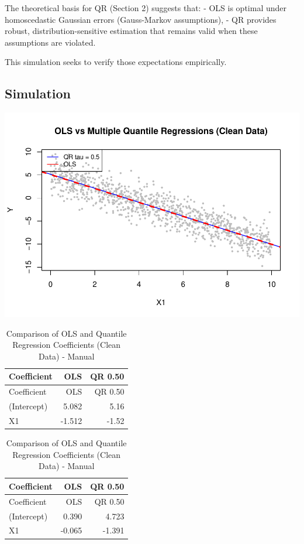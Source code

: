 \documentclass[fleqn,8pt]{latex/stylish_article} %
\begin{document}
The theoretical basis for QR (Section 2) suggests that:
- OLS is optimal under homoscedastic Gaussian errors (Gauss-Markov assumptions),
- QR provides robust, distribution-sensitive estimation that remains valid when these assumptions are violated.

This simulation seeks to verify those expectations empirically.

\subsection{Simulation}\label{simulation}

\begin{center}\includegraphics[width=0.8\linewidth]{ADR_project_files/figure-latex/unnamed-chunk-8-1} \end{center}

\begin{longtable}[]{@{}lrr@{}}
\caption{\label{tab:unnamed-chunk-9}Comparison of OLS and Quantile Regression Coefficients (Clean Data) - Manual}\tabularnewline
\toprule\noalign{}
Coefficient & OLS & QR 0.50 \\
\midrule\noalign{}
\endfirsthead
\toprule\noalign{}
Coefficient & OLS & QR 0.50 \\
\midrule\noalign{}
\endhead
\bottomrule\noalign{}
\endlastfoot
(Intercept) & 5.082 & 5.16 \\
X1 & -1.512 & -1.52 \\
\end{longtable}

\begin{longtable}[]{@{}lrr@{}}
\caption{\label{tab:unnamed-chunk-10}Comparison of OLS and Quantile Regression Coefficients (Clean Data) - Manual}\tabularnewline
\toprule\noalign{}
Coefficient & OLS & QR 0.50 \\
\midrule\noalign{}
\endfirsthead
\toprule\noalign{}
Coefficient & OLS & QR 0.50 \\
\midrule\noalign{}
\endhead
\bottomrule\noalign{}
\endlastfoot
(Intercept) & 0.390 & 4.723 \\
X1 & -0.065 & -1.391 \\
\end{longtable}
\end{document}
